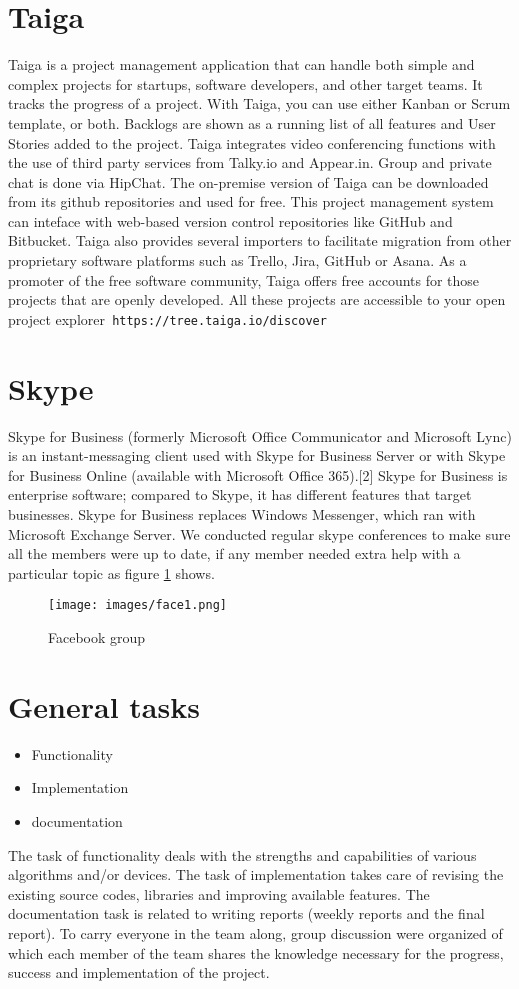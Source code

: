 \documentclass[a4paper]{report}
\begin{document}
\section{Taiga}
Taiga is a project management application that can handle both simple and complex projects for startups, software developers, and other target teams. It tracks the progress of a project. With Taiga, you can use either Kanban or Scrum template, or both. Backlogs are shown as a running list of all features and User Stories added to the project.
Taiga integrates video conferencing functions with the use of third party services from Talky.io and Appear.in. Group and private chat is done via HipChat.
The on-premise version of Taiga can be downloaded from its github repositories and used for free.
This project management system can inteface with web-based version control repositories like GitHub and Bitbucket. Taiga also provides several importers to facilitate migration from other proprietary software platforms such as Trello, Jira, GitHub or Asana.
As a promoter of the free software community, Taiga offers free accounts for those projects that are openly developed. All these projects are accessible to your open project explorer\texttt{ https://tree.taiga.io/discover} 
\section{Skype}
Skype for Business (formerly Microsoft Office Communicator and Microsoft Lync) is an instant-messaging client used with Skype for Business Server or with Skype for Business Online (available with Microsoft Office 365).[2] Skype for Business is enterprise software; compared to Skype, it has different features that target businesses. Skype for Business replaces Windows Messenger, which ran with Microsoft Exchange Server.
We conducted regular skype conferences to make sure all the members were up to date, if any member needed extra help with a particular topic as figure \ref{face1} shows.

\begin{figure}[h]
\centering
\texttt{[image: images/face1.png]}
\caption{Facebook group}
\label{face1}
\end{figure}

\section{General tasks }
\begin{itemize}
\item	Functionality
\item	Implementation
\item	documentation

\end{itemize}
The task of functionality deals with the strengths and capabilities of various algorithms and/or devices. The task of implementation takes care of revising the existing source codes, libraries and improving available features.
The documentation  task is related to writing reports (weekly reports and the final report). To carry everyone in the team along, group discussion were organized of which each member of the team shares the knowledge necessary for the progress, success and implementation of the project.
\end{document}
